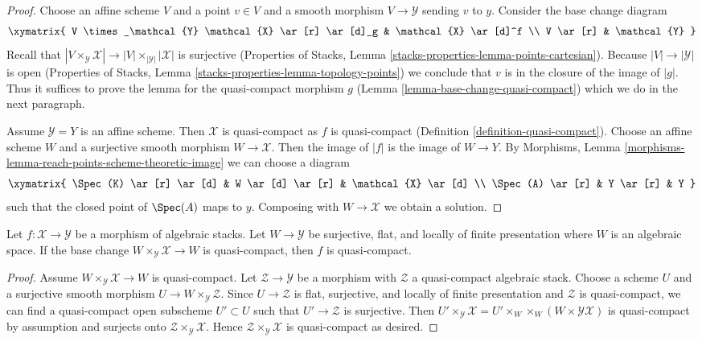 \begin{proof}
Choose an affine scheme $V$ and a point $v \in V$ and a smooth morphism
$V \to \mathcal{Y}$ sending $v$ to $y$. Consider the base change diagram
$$
\xymatrix{
V \times_\mathcal{Y} \mathcal{X} \ar[r] \ar[d]_g & \mathcal{X} \ar[d]^f \\
V \ar[r] & \mathcal{Y}
}
$$
Recall that $|V \times_\mathcal{Y} \mathcal{X}| \to
|V| \times_{|\mathcal{Y}|} |\mathcal{X}|$ is surjective
(Properties of Stacks, Lemma \ref{stacks-properties-lemma-points-cartesian}).
Because $|V| \to |\mathcal{Y}|$ is open
(Properties of Stacks, Lemma \ref{stacks-properties-lemma-topology-points})
we conclude that $v$ is in the closure of the image of $|g|$.
Thus it suffices to prove the lemma for the quasi-compact morphism $g$
(Lemma \ref{lemma-base-change-quasi-compact}) which we do in the next
paragraph.

\medskip\noindent
Assume $\mathcal{Y} = Y$ is an affine scheme. Then $\mathcal{X}$
is quasi-compact as $f$ is quasi-compact
(Definition \ref{definition-quasi-compact}).
Choose an affine scheme $W$ and a surjective smooth morphism
$W \to \mathcal{X}$. Then the image of $|f|$ is the image
of $W \to Y$.
By Morphisms, Lemma \ref{morphisms-lemma-reach-points-scheme-theoretic-image}
we can choose a diagram
$$
\xymatrix{
\Spec(K) \ar[r] \ar[d] & W \ar[d] \ar[r] & \mathcal{X} \ar[d] \\
\Spec(A) \ar[r] & Y \ar[r] & Y
}
$$
such that the closed point of $\Spec(A)$ maps to $y$.
Composing with $W \to \mathcal{X}$ we obtain a solution.
\end{proof}

\begin{lemma}
\label{lemma-check-quasi-compact-covering}
Let $f : \mathcal{X} \to \mathcal{Y}$ be a morphism of algebraic stacks.
Let $W \to \mathcal{Y}$ be surjective, flat, and locally of finite
presentation where $W$ is an algebraic space. If the base change
$W \times_\mathcal{Y} \mathcal{X} \to W$ is quasi-compact, then
$f$ is quasi-compact.
\end{lemma}

\begin{proof}
Assume $W \times_\mathcal{Y} \mathcal{X} \to W$ is quasi-compact.
Let $\mathcal{Z} \to \mathcal{Y}$ be a morphism with $\mathcal{Z}$
a quasi-compact algebraic stack. Choose a scheme $U$ and a surjective
smooth morphism
$U \to W \times_\mathcal{Y} \mathcal{Z}$.
Since $U \to \mathcal{Z}$ is flat, surjective, and locally of finite
presentation and $\mathcal{Z}$ is quasi-compact, we can find a
quasi-compact open subscheme $U' \subset U$ such that
$U' \to \mathcal{Z}$ is surjective.
Then
$U' \times_\mathcal{Y} \mathcal{X} =
U' \times_W \times_W (W \times \mathcal{Y} \mathcal{X})$
is quasi-compact by assumption and surjects onto
$\mathcal{Z} \times_\mathcal{Y} \mathcal{X}$.
Hence $\mathcal{Z} \times_\mathcal{Y} \mathcal{X}$
is quasi-compact as desired.
\end{proof}











